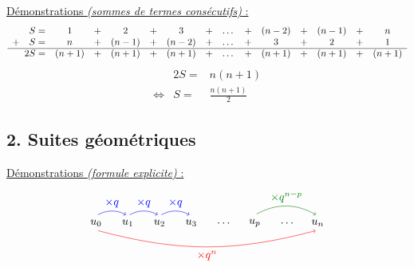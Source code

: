 \documentclass[11pt,a4paper]{article}
\begin{document}
\underline{Démonstrations \emph{(sommes de termes consécutifs)} :}
\begin{equation*}
  \begin{array}{r c c c c c c c c c c c c c c}
    S=        & 1     & + & 2     & + & 3     & + & \dots & + & (n-2) & + & (n-1) & + & n     \\
    +\quad S= & n     & + & (n-1) & + & (n-2) & + & \dots & + & 3     & + & 2     & + & 1     \\
    \cline{1-14}
    2S=       & (n+1) & + & (n+1) & + & (n+1) & + & \dots & + & (n+1) & + & (n+1) & + & (n+1) \\
  \end{array}
\end{equation*}
\vspace{-12pt}
\begin{equation*}
  \renewcommand{\arraystretch}{2}
  \begin{array}{rrl}
                    & 2S= & n(n+1)                         \\
    \Leftrightarrow & S=  & \displaystyle \frac{n(n+1)}{2}
  \end{array}
\end{equation*}

\newpage

\subsection*{2. Suites géométriques}

\underline{Démonstrations \emph{(formule explicite)} :}
\begin{equation*}
  \begin{tikzpicture}[baseline=(math.base)]
    \node[anchor=east] (u0) at (0,0) {$u_0$};
    \node[anchor=east] (u1) at (1,0) {$u_1$};
    \node[anchor=east] (u2) at (2,0) {$u_2$};
    \node[anchor=east] (u3) at (3,0) {$u_3$};
    \node[anchor=east] (d) at (4.1,0) {$\dots$};
    \node[anchor=east] (up) at (5,0) {$u_p$};
    \node[anchor=east] (d) at (6.1,0) {$\dots$};
    \node[anchor=east] (un) at (7,0) {$u_n$};
    \node[inner sep=0] (math) at (u0|-u0.south) {$\phantom{u_0}$};
    \draw[->,blue,shorten >=2pt,shorten <=2pt] (u0.north) to[bend left] node[above,midway] {$\times q$} (u1.north);
    \draw[->,blue,shorten >=2pt,shorten <=2pt] (u1.north) to[bend left] node[above,midway] {$\times q$} (u2.north);
    \draw[->,blue,shorten >=2pt,shorten <=2pt] (u2.north) to[bend left] node[above,midway] {$\times q$} (u3.north);
    \draw[->,dark_green,shorten >=2pt,shorten <=2pt] (up.north) to[bend left] node[above,midway] {$\times q^{n-p}$} (un.north);
    \draw[->,red,shorten >=2pt,shorten <=2pt] (u0.south) to[bend right=15] node[below,midway] {$\times q^n$} (un.south);
  \end{tikzpicture}
\end{equation*}
\end{document}
